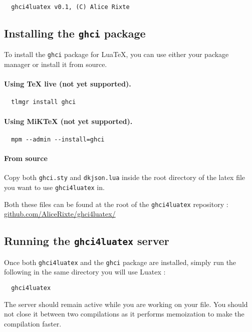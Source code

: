\documentclass{article}
\begin{document}
\begin{verbatim}
  ghci4luatex v0.1, (C) Alice Rixte
\end{verbatim}
\subsection{Installing the \texttt{ghci} package}

To install the \texttt{ghci} package for Lua\TeX, you can use either your package manager or install it from source.

\paragraph{Using TeX live (not yet supported).}
\begin{verbatim}
  tlmgr install ghci
\end{verbatim}
\paragraph{Using MiKTeX (not yet supported). }
\begin{verbatim}
  mpm --admin --install=ghci
\end{verbatim}
\paragraph{From source}
Copy both \texttt{ghci.sty} and \texttt{dkjson.lua} inside the root directory of the latex file you want to use \texttt{ghci4luatex} in.

Both these files can be found at the root of the \texttt{ghci4luatex} repository : \href{https://github.com/AliceRixte/ghci4luatex/}{github.com/AliceRixte/ghci4luatex/}

\subsection{Running the \texttt{ghci4luatex} server}

Once both \texttt{ghci4luatex} and the \texttt{ghci} package are installed, simply run the following in the same directory you will use Luatex :

\begin{verbatim}
  ghci4luatex
\end{verbatim}

The server should remain active while you are working on your file. You should not close it between two compilations as it performs memoization to make the compilation faster.
\end{document}

